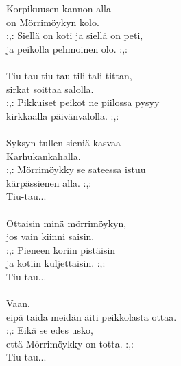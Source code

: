 
Korpikuusen kannon alla \\ on Mörrimöykyn kolo. \\ :,: Siellä on koti ja siellä on peti, \\ ja peikolla pehmoinen olo. :,: \\ \hspace{10mm} \\ Tiu-tau-tiu-tau-tili-tali-tittan, \\ sirkat soittaa salolla. \\ :,: Pikkuiset peikot ne piilossa pysyy \\ kirkkaalla päivänvalolla. :,: \\ \hspace{10mm} \\ Syksyn tullen sieniä kasvaa \\ Karhukankahalla. \\ :,: Mörrimöykky se sateessa istuu \\ kärpässienen alla. :,: \\ Tiu-tau... \\ \hspace{10mm} \\ Ottaisin minä mörrimöykyn, \\ jos vain kiinni saisin. \\ :,: Pieneen koriin pistäisin \\ ja kotiin kuljettaisin. :,: \\ Tiu-tau... \\ \hspace{10mm} \\ Vaan, \\ eipä taida meidän äiti peikkolasta ottaa. \\ :,: Eikä se edes usko, \\ että Mörrimöykky on totta. :,: \\ Tiu-tau...